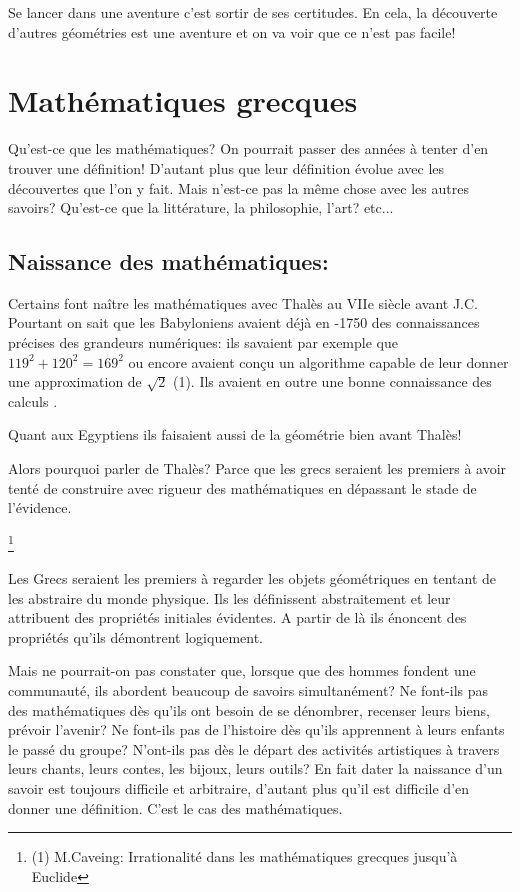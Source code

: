 \documentclass[a4paper, 12pt, twoside]{book}
\begin{document}
   Se lancer dans une aventure c'est sortir de ses certitudes. En cela, la découverte d'autres géométries est une aventure et on va voir que ce n'est pas facile! 
   
\chapter{Mathématiques grecques}

Qu'est-ce que les mathématiques? On pourrait passer des années à tenter d'en trouver une définition! D'autant plus que leur définition évolue avec les découvertes que l'on y fait. Mais n'est-ce pas la même chose avec les autres savoirs? Qu'est-ce que la littérature, la philosophie, l'art? etc...

\section{Naissance des mathématiques:}



    Certains font  naître les mathématiques avec Thalès au VIIe siècle  avant J.C. Pourtant on sait que les Babyloniens avaient déjà en -1750 des connaissances précises des grandeurs numériques: ils savaient par exemple que $119^{2}+120^{2}=169^{2}$ ou encore avaient conçu un algorithme capable de leur donner une approximation de $\sqrt{2}$ (1). Ils avaient en outre une bonne connaissance des calculs .\
     
     Quant aux Egyptiens ils faisaient aussi de la géométrie bien avant Thalès!\ 
   
   
   Alors pourquoi parler de Thalès? Parce que les grecs seraient les premiers à avoir tenté de  construire  avec rigueur des mathématiques en dépassant le stade de l'évidence.


  
  \footnote{(1) M.Caveing: Irrationalité dans les mathématiques grecques jusqu'à Euclide} 
  
  
  Les Grecs seraient les premiers à regarder les objets géométriques en tentant de les abstraire du monde physique. Ils les définissent abstraitement et leur attribuent des propriétés initiales évidentes. A partir de là ils énoncent des propriétés qu'ils démontrent logiquement.

      Mais ne pourrait-on pas constater que, lorsque que des hommes fondent une
communauté, ils abordent beaucoup de savoirs simultanément? Ne font-ils pas des mathématiques dès qu'ils ont besoin de se dénombrer, recenser leurs biens, prévoir l'avenir? Ne font-ils pas de l'histoire dès qu'ils apprennent à leurs enfants le passé du groupe? N'ont-ils pas dès le départ des activités artistiques à travers leurs chants, leurs contes, les bijoux, leurs outils? En fait dater la naissance d'un savoir est toujours difficile et arbitraire, d'autant plus qu'il est difficile d'en donner une définition.  C'est le cas des mathématiques.\
\end{document}

